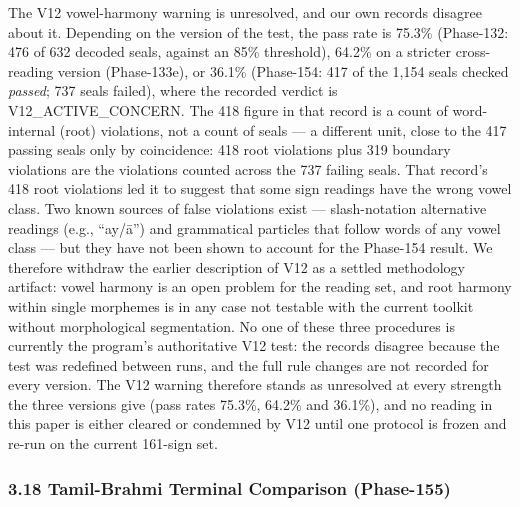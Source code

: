 \documentclass[
]{article}
\begin{document}
The V12 vowel-harmony warning is unresolved, and our own records disagree about it. Depending on the version of the test, the pass rate is 75.3\% (Phase-132: 476 of 632 decoded seals, against an 85\% threshold), 64.2\% on a stricter cross-reading version (Phase-133e), or 36.1\% (Phase-154: 417 of the 1,154 seals checked \emph{passed}; 737 seals failed), where the recorded verdict is V12\_ACTIVE\_CONCERN. The 418 figure in that record is a count of word-internal (root) violations, not a count of seals --- a different unit, close to the 417 passing seals only by coincidence: 418 root violations plus 319 boundary violations are the violations counted across the 737 failing seals. That record's 418 root violations led it to suggest that some sign readings have the wrong vowel class. Two known sources of false violations exist --- slash-notation alternative readings (e.g., ``ay/ā'') and grammatical particles that follow words of any vowel class --- but they have not been shown to account for the Phase-154 result. We therefore withdraw the earlier description of V12 as a settled methodology artifact: vowel harmony is an open problem for the reading set, and root harmony within single morphemes is in any case not testable with the current toolkit without morphological segmentation. No one of these three procedures is currently the program's authoritative V12 test: the records disagree because the test was redefined between runs, and the full rule changes are not recorded for every version. The V12 warning therefore stands as unresolved at every strength the three versions give (pass rates 75.3\%, 64.2\% and 36.1\%), and no reading in this paper is either cleared or condemned by V12 until one protocol is frozen and re-run on the current 161-sign set.

\subsubsection{3.18 Tamil-Brahmi Terminal Comparison (Phase-155)}\label{tamil-brahmi-terminal-cross-validation-phase-155}
\end{document}
